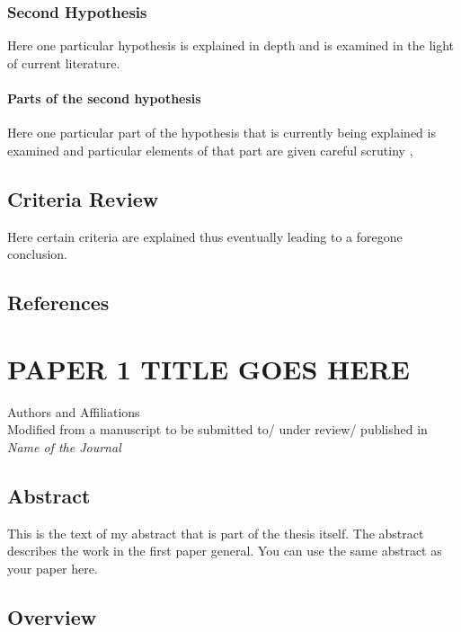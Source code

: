 \documentclass[
  12pt,
  notitlepage]{isuthesis}
\begin{document}
\subsection{Second Hypothesis}

Here one particular hypothesis is explained in depth
and is examined in the light of current literature.

\subsubsection{Parts of the second hypothesis}

Here one particular part of the hypothesis that is
currently being explained is examined and particular
elements of that part are given careful scrutiny
\cite{allen}, \cite{bruner}

\section{Criteria Review}

Here certain criteria are explained thus eventually
leading to a foregone conclusion.

\section{References}

\printbibliography[heading=none, section=\therefsection]

\chapter{PAPER 1 TITLE GOES HERE}

\label{polymer_fibers}

\begin{center}
    Authors and Affiliations \\
    Modified from a manuscript to be submitted to/ under review/ published in \textit{Name of the Journal} 
\end{center}

\section{Abstract}

This is the text of my abstract that is part of the thesis itself.
The abstract describes the work in the first paper general. You can use the same abstract as your paper here.

\section{Overview}
\end{document}
